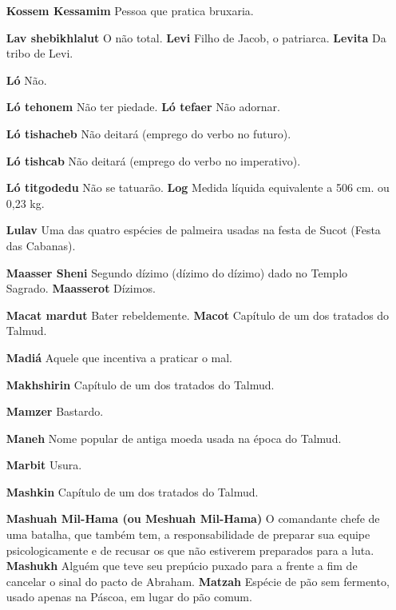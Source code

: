 \begin{itemize}
\begin{enumrate}
\begin{itemize}
\begin{itemize}
\begin{itemize}
\begin{itemize}
\begin{itemize}
\item[\textbf{Kossem Kessamim}] Pessoa que pra­tica bruxaria.

\item[\textbf{Lav shebikhlalut} O não total. \textbf{Levi}] Filho de Jacob,
o patriarca. \textbf{Levita} Da tribo de Levi.

\item[\textbf{Ló}] Não.

\item[\textbf{Ló tehonem} Não ter piedade. \textbf{Ló tefaer}] Não adornar.

\item[\textbf{Ló tishacheb}] Não deitará (emprego do verbo no futuro).

\item[\textbf{Ló tishcab}] Não deitará (emprego do verbo no imperativo).

\item[\textbf{Ló titgodedu} Não se tatuarão. \textbf{Log}] Medida líquida
equivalente a 506 cm. ou 0,23 kg.

\item[\textbf{Lulav}] Uma das quatro espécies de palmeira usadas na festa de
Sucot (Festa das Cabanas).

\item[\textbf{Maasser Sheni}] Segundo dízimo (dízi­mo do dízimo) dado no
Templo Sagrado. \textbf{Maasserot} Dízimos.

\item[\textbf{Macat mardut} Bater rebeldemente. \textbf{Macot}] Capítulo de
um dos tratados do Talmud.

\item[\textbf{Madiá}] Aquele que incentiva a prati­car o mal.

\item[\textbf{Makhshirin}] Capítulo de um dos tra­tados do Talmud.

\item[\textbf{Mamzer}] Bastardo.

\item[\textbf{Maneh}] Nome popular de antiga moe­da usada na época do Talmud.
\item[\textbf{Marbit}] Usura.

\item[\textbf{Mashkin}] Capítulo de um dos trata­dos do Talmud.

\item[\textbf{Mashuah Mil-Hama (ou Meshuah Mil-Hama)}] O comandante chefe de
uma batalha, que também tem, a res­ponsabilidade de preparar sua equipe
psicologicamente e de recusar os que não estiverem preparados para a
luta. \textbf{Mashukh} Alguém que teve seu pre­púcio puxado para a
frente a fim de cancelar o sinal do pacto de Abraham. \textbf{Matzah}
Espécie de pão sem fermen­to, usado apenas na Páscoa, em lugar do pão
comum.


\end{itemize}
\end{itemize}
\end{itemize}
\end{itemize}
\end{itemize}
\end{enumrate}
\end{itemize}
